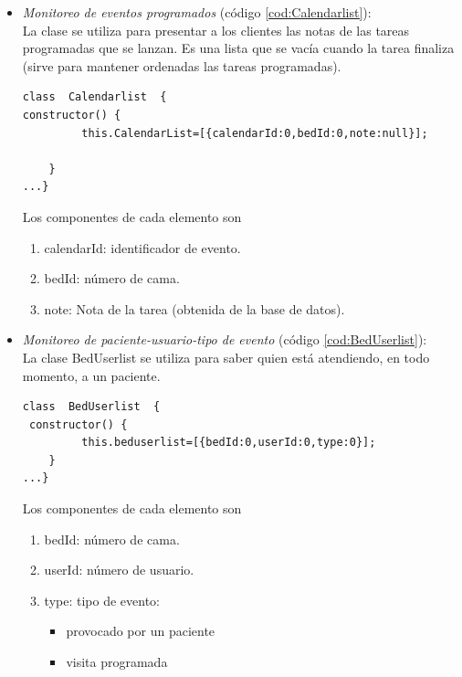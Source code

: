 \begin{itemize}
\item \textit{ Monitoreo de eventos programados} (código \ref{cod:Calendarlist}):\\
La clase se utiliza para presentar a los clientes las notas de las tareas programadas que se lanzan. Es una lista que se vacía cuando la tarea finaliza (sirve para mantener ordenadas las tareas programadas).

\begin{lstlisting}[label=cod:Calendarlist,caption=  Clase CalendarList]
class  Calendarlist  {   
constructor() {
         this.CalendarList=[{calendarId:0,bedId:0,note:null}];                
        
    }
...}
\end{lstlisting}

Los componentes de cada elemento son 
	\begin{enumerate}
		\item calendarId: identificador de evento.
		\item bedId: número de cama.
		\item note: Nota de la tarea (obtenida de la base de datos).		

	\end{enumerate}




\item \textit{ Monitoreo de paciente-usuario-tipo de evento} (código \ref{cod:BedUserlist}):\\
La clase BedUserlist se utiliza para saber quien está atendiendo, en todo momento, a un paciente.

\begin{lstlisting}[label=cod:BedUserlist,caption=  Clase BedsUserList]
class  BedUserlist  { 
 constructor() {
         this.beduserlist=[{bedId:0,userId:0,type:0}];                        
    }
...}
\end{lstlisting}

Los componentes de cada elemento son 
	\begin{enumerate}
		\item bedId: número de cama.
		\item userId: número de usuario.
		\item type: tipo de evento: 
		\begin{itemize}
			\item provocado por un paciente
			\item visita programada		
		\end{itemize}		 	

	\end{enumerate}


\end{itemize}
